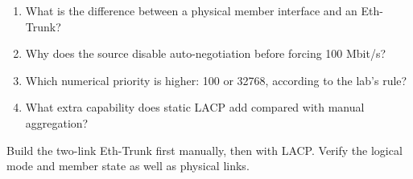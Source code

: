 \begin{quickcheck}
\begin{enumerate}
\item What is the difference between a physical member interface and an Eth-Trunk?
\item Why does the source disable auto-negotiation before forcing 100 Mbit/s?
\item Which numerical priority is higher: 100 or 32768, according to the lab's rule?
\item What extra capability does static LACP add compared with manual aggregation?
\end{enumerate}
\end{quickcheck}

\begin{chapterrecap}
Build the two-link Eth-Trunk first manually, then with LACP. Verify the logical mode and member state as well as physical links.
\end{chapterrecap}


